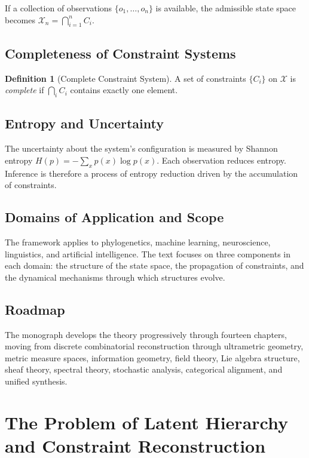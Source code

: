 \documentclass[12pt,a4paper,oneside]{book}
\numberwithin{equation}{chapter}
\theoremstyle{plain}
\theoremstyle{definition}
\newtheorem{definition}[theorem]{Definition}
\theoremstyle{remark}
\begin{document}
If a collection of observations $\{o_1, \dots, o_n\}$ is available,
the admissible state space becomes $\mathcal{X}_n = \bigcap_{i=1}^n
C_i$.

\section{Completeness of Constraint Systems}

\begin{definition}[Complete Constraint System]
\label{def:complete-constraint}
A set of constraints $\{C_i\}$ on $\mathcal{X}$ is \emph{complete}
if $\bigcap_i C_i$ contains exactly one element.
\end{definition}

\section{Entropy and Uncertainty}

The uncertainty about the system's configuration is measured by
Shannon entropy $H(p) = -\sum_x p(x)\log p(x)$. Each observation
reduces entropy. Inference is therefore a process of entropy reduction
driven by the accumulation of constraints.

\section{Domains of Application and Scope}

The framework applies to phylogenetics, machine learning, neuroscience,
linguistics, and artificial intelligence. The text focuses on three
components in each domain: the structure of the state space, the
propagation of constraints, and the dynamical mechanisms through which
structures evolve.

\section{Roadmap}

The monograph develops the theory progressively through fourteen
chapters, moving from discrete combinatorial reconstruction through
ultrametric geometry, metric measure spaces, information geometry,
field theory, Lie algebra structure, sheaf theory, spectral theory,
stochastic analysis, categorical alignment, and unified synthesis.


\chapter[Latent Hierarchy and Constraint Reconstruction]{The Problem of Latent Hierarchy and Constraint Reconstruction}
\label{ch:hierarchy}
\end{document}

